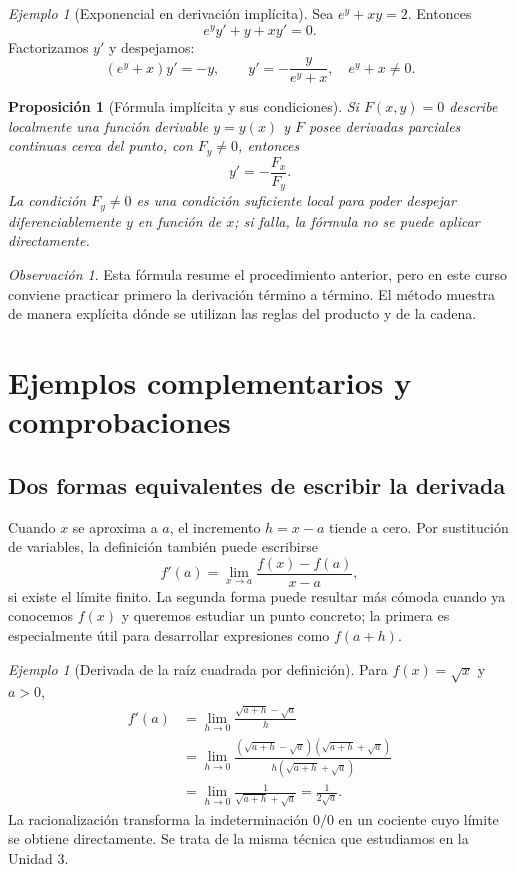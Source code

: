\documentclass[12pt]{article}
\newtheorem{proposicion}[definicion]{Proposición}
\theoremstyle{remark}
\newtheorem{observacion}[definicion]{Observación}
\newtheorem{ejemplo}[definicion]{Ejemplo}
\begin{document}
\begin{ejemplo}[Exponencial en derivación implícita]
Sea $e^y+xy=2$. Entonces
\[
e^y y'+y+xy'=0.
\]
Factorizamos $y'$ y despejamos:
\[
(e^y+x)y'=-y,\qquad
\boxed{y'=-\frac{y}{e^y+x}},\quad e^y+x\ne0.
\]
\end{ejemplo}

\begin{proposicion}[Fórmula implícita y sus condiciones]
Si $F(x,y)=0$ describe localmente una función derivable $y=y(x)$ y $F$ posee derivadas parciales continuas cerca del punto, con $F_y\ne0$, entonces
\[
\boxed{y'=-\frac{F_x}{F_y}.}
\]
La condición $F_y\ne0$ es una condición suficiente local para poder despejar diferenciablemente $y$ en función de $x$; si falla, la fórmula no se puede aplicar directamente.
\end{proposicion}

\begin{observacion}
Esta fórmula resume el procedimiento anterior, pero en este curso conviene practicar primero la derivación término a término. El método muestra de manera explícita dónde se utilizan las reglas del producto y de la cadena.
\end{observacion}

\section{Ejemplos complementarios y comprobaciones}
\subsection*{Dos formas equivalentes de escribir la derivada}
Cuando $x$ se aproxima a $a$, el incremento $h=x-a$ tiende a cero. Por sustitución de variables, la definición también puede escribirse
\[
\boxed{f'(a)=\lim_{x\to a}\frac{f(x)-f(a)}{x-a}},
\]
si existe el límite finito. La segunda forma puede resultar más cómoda cuando ya conocemos $f(x)$ y queremos estudiar un punto concreto; la primera es especialmente útil para desarrollar expresiones como $f(a+h)$.

\begin{ejemplo}[Derivada de la raíz cuadrada por definición]
Para $f(x)=\sqrt{x}$ y $a>0$,
\begin{align*}
f'(a)&=\lim_{h\to0}\frac{\sqrt{a+h}-\sqrt a}{h}\\
&=\lim_{h\to0}\frac{(\sqrt{a+h}-\sqrt a)(\sqrt{a+h}+\sqrt a)}{h(\sqrt{a+h}+\sqrt a)}\\
&=\lim_{h\to0}\frac{1}{\sqrt{a+h}+\sqrt a}
=\boxed{\frac1{2\sqrt a}}.
\end{align*}
La racionalización transforma la indeterminación $0/0$ en un cociente cuyo límite se obtiene directamente. Se trata de la misma técnica que estudiamos en la Unidad 3.
\end{ejemplo}
\end{document}
